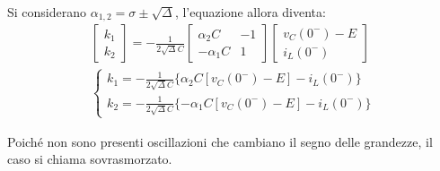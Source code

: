 \documentclass{article}
\numberwithin{equation}{subsection}
\begin{document}
Si considerano $\alpha_{1,2}=\sigma\pm\sqrt\Delta$, l'equazione allora diventa:
\begin{gather*}
    \begin{bmatrix}
        k_1\\k_2
    \end{bmatrix}=\displaystyle-\frac{1}{2\sqrt{\Delta} C}\begin{bmatrix}
        \alpha_2C&-1\\-\alpha_1C&1
    \end{bmatrix}\begin{bmatrix}
        v_C(0^-)-E\\i_L(0^-)
    \end{bmatrix}\\
    \begin{cases}
        k_1=\displaystyle-\frac{1}{2\sqrt{\Delta} C}\{\alpha_2C[v_C(0^-)-E]-i_L(0^-)\}\\
        k_2=\displaystyle-\frac{1}{2\sqrt{\Delta} C}\{-\alpha_1C[v_C(0^-)-E]-i_L(0^-)\}
    \end{cases}
\end{gather*}
 

Poiché non sono presenti oscillazioni che cambiano il segno delle grandezze, il caso si chiama sovrasmorzato. 
\end{document}
